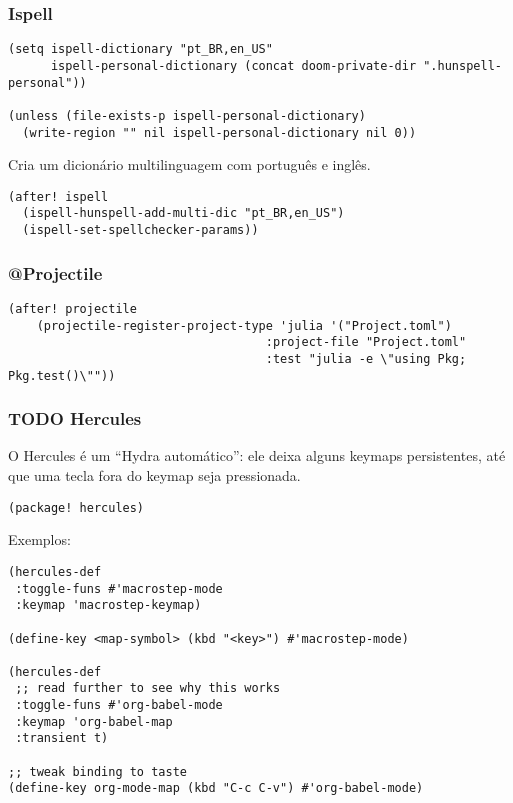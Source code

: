 \documentclass[11pt]{article}
\begin{document}
\subsubsection{Ispell}
\label{sec:orgaaad1bf}

\begin{verbatim}
(setq ispell-dictionary "pt_BR,en_US"
      ispell-personal-dictionary (concat doom-private-dir ".hunspell-personal"))

(unless (file-exists-p ispell-personal-dictionary)
  (write-region "" nil ispell-personal-dictionary nil 0))
\end{verbatim}

Cria um dicionário multilinguagem com português e inglês.

\begin{verbatim}
(after! ispell
  (ispell-hunspell-add-multi-dic "pt_BR,en_US")
  (ispell-set-spellchecker-params))
\end{verbatim}

\subsubsection{@Projectile}
\label{sec:org88d39a6}
\begin{verbatim}
(after! projectile
    (projectile-register-project-type 'julia '("Project.toml")
                                    :project-file "Project.toml"
                                    :test "julia -e \"using Pkg; Pkg.test()\""))
\end{verbatim}

\subsubsection{{\bfseries\sffamily TODO} Hercules}
\label{sec:org51a57c0}

O Hercules é um ``Hydra automático'': ele deixa alguns keymaps persistentes, até
que uma tecla fora do keymap seja pressionada.

\begin{verbatim}
(package! hercules)
\end{verbatim}

Exemplos:
\begin{verbatim}
(hercules-def
 :toggle-funs #'macrostep-mode
 :keymap 'macrostep-keymap)
 
(define-key <map-symbol> (kbd "<key>") #'macrostep-mode)

(hercules-def
 ;; read further to see why this works
 :toggle-funs #'org-babel-mode
 :keymap 'org-babel-map
 :transient t)
 
;; tweak binding to taste
(define-key org-mode-map (kbd "C-c C-v") #'org-babel-mode)
\end{verbatim}
\end{document}
